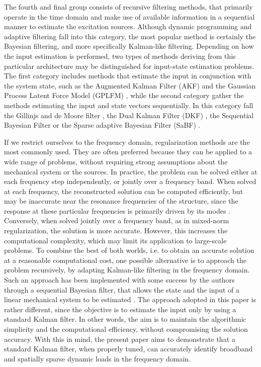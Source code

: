 \documentclass[5p,12pt]{elsarticle}
\begin{document}
The fourth and final group consists of recursive filtering methods, that primarily operate in the time domain and make use of available information in a sequential manner to estimate the excitation sources. Although dynamic programming \cite{Bus97, Nor06} and adaptive filtering \cite{Stu12} fall into this category, the most popular method is certainly the Bayesian filtering, and more specifically Kalman-like filtering. Depending on how the input estimation is performed, two types of methods deriving from this particular architecture may be distinguished for input-state estimation problems. The first category includes methods that estimate the input in conjunction with the system state, such as the Augmented Kalman Filter (AKF) \cite{Lou12} and the Gaussian Process Latent Force Model (GPLFM) \cite{Nay19, Zou23}, while the second category gather the methods estimating the input and state vectors sequentially. In this category fall the Gillinjs and de Moore filter \cite{Lou12b}, the Dual Kalman Filter (DKF) \cite{Eft15}, the Sequential Bayesian Filter \cite{Sed19} or the Sparse adaptive Bayesian Filter (SaBF) \cite{Ghi22}. \bigskip

If we restrict ourselves to the frequency domain, regularization methods are the most commonly used. They are often preferred because they can be applied to a wide range of problems, without requiring strong assumptions about the mechanical system or the sources. In practice, the problem can be solved either at each frequency step independently, or jointly over a frequency band. When solved at each frequency, the reconstructed solution can be computed efficiently, but may be inaccurate near the resonance frequencies of the structure, since the response at these particular frequencies is primarily driven by its modes \cite{Auc14}. Conversely, when solved jointly over a frequency band, as in mixed-norm regularization, the solution is more accurate. However, this increases the computational complexity, which may limit its application to large-scale problems. To combine the best of both worlds, i.e. to obtain an accurate solution at a reasonable computational cost, one possible alternative is to approach the problem recursively, by adapting Kalman-like filtering in the frequency domain. Such an approach has been implemented with some success by the authors through a sequential Bayesian filter, that allows the state and the input of a linear mechanical system to be estimated \cite{Auc25}. The approach adopted in this paper is rather different, since the objective is to estimate the input only by using a standard Kalman filter. In other words, the aim is to maintain the algorithmic simplicity and the computational efficiency, without compromising the solution accuracy. With this in mind, the present paper aims to demonstrate that a standard Kalman filter, when properly tuned, can accurately identify broadband and spatially sparse dynamic loads in the frequency domain. \bigskip
\end{document}

